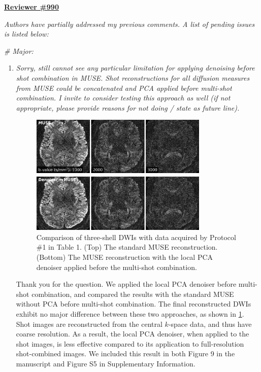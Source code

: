\documentclass[a4paper,11pt,twoside]{report}
\begin{document}
\clearpage
\noindent \underline{\textbf{Reviewer \#990}}

\textit{Authors have partially addressed my previous comments. A list of pending issues is listed below:}

\vspace{1em}

\noindent \textit{\# Major:}

\vspace{1em}

\begin{enumerate}
    \item [3.b.1)] \textit{Sorry, still cannot see any particular limitation for applying denoising before shot combination in MUSE. Shot reconstructions for all diffusion measures from MUSE could be concatenated and PCA applied before multi-shot combination. I invite to consider testing this approach as well (if not appropriate, please provide reasons for not doing / state as future line).}

    \begin{figure}[h]
        \centering
        \includegraphics[width=0.8\textwidth]{denoiser_muse.png}
        \caption{Comparison of three-shell DWIs with data
        acquired by Protocol \#1 in Table 1.
        (Top) The standard MUSE reconstruction.
        (Bottom) The MUSE reconstruction with the local PCA denoiser
        applied before the multi-shot combination.}
        \label{FIG:DENOISER}
    \end{figure}

    \hspace{1em} {\color{blue} Thank you for the question.
    We applied the local PCA denoiser before multi-shot combination,
    and compared the results with the standard MUSE
    without PCA before multi-shot combination.
    The final reconstructed DWIs exhibit no major difference
    between these two approaches, as shown in \cref{FIG:DENOISER}.
    Shot images are reconstructed from the central $k$-space data,
    and thus have coarse resolution.
    As a result, the local PCA denoiser, when applied to the shot images,
    is less effective compared to its application to
    full-resolution shot-combined images.
    We included this result in both Figure 9 in the manuscript
    and Figure S5 in Supplementary Information.
    }


\end{enumerate}
\end{document}

